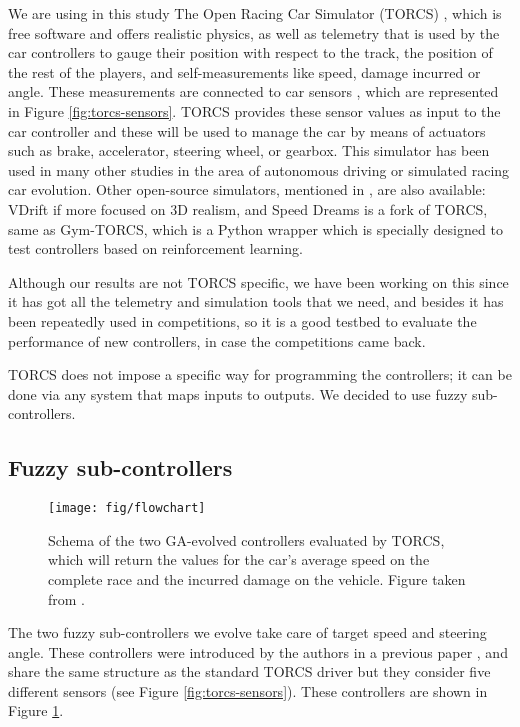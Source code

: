 \documentclass[10pt,journal,compsoc]{IEEEtran}
\begin{document}
We are using in this study The Open Racing Car Simulator (TORCS) \cite{torcs4}, which is free software and offers realistic physics, as well as telemetry that is used by the car controllers to gauge their position with respect to the track, the position of the rest of the players, and self-measurements like speed, damage incurred or angle. These measurements are connected to car sensors \cite{torcs5}, which are represented in Figure \ref{fig:torcs-sensors}. TORCS provides these sensor values as input to the car controller and these will be
used to manage the car by means of actuators such as brake, accelerator, steering wheel, or gearbox. 
This simulator has been used in many other studies in the area of autonomous driving or simulated racing car evolution.
Other open-source simulators, mentioned in \cite{Loiacono:2012:LEA:2212908.2212953}, are also available: VDrift
if more focused on 3D realism, and Speed Dreams is  a fork of
TORCS, same as Gym-TORCS, which is a Python wrapper which is specially designed to test controllers based on reinforcement learning.

Although our results are not TORCS specific, we have been
working on this since it has got all the telemetry and simulation
tools that we need, and besides it has been repeatedly used in
competitions, so it is a good testbed to evaluate the performance of new controllers, in case the competitions came back.

TORCS does not impose a specific way for programming the controllers;
it can be done via any system that maps inputs to outputs. We decided
to use fuzzy sub-controllers.


\subsection{Fuzzy sub-controllers}
\label{subsec:fuzzy-controllers}

\begin{figure}[!ht]
  \begin{center}
    \texttt{[image: fig/flowchart]}
  \end{center}
  \caption{Schema of the two GA-evolved controllers evaluated by TORCS, which will
    return the values for the car's average speed on the complete race
    and the incurred damage on the vehicle. Figure taken from
    \cite{salem_evo18}.}
    \label{fig:ga}
\end{figure}
%
The two fuzzy sub-controllers we evolve take care of target speed and steering angle. These controllers were introduced by the authors in a previous paper \cite{salem_evo17}, and share the same structure as the standard TORCS driver but they consider five different sensors (see Figure \ref{fig:torcs-sensors}). These controllers are shown in Figure \ref{fig:ga}. 
\end{document}
